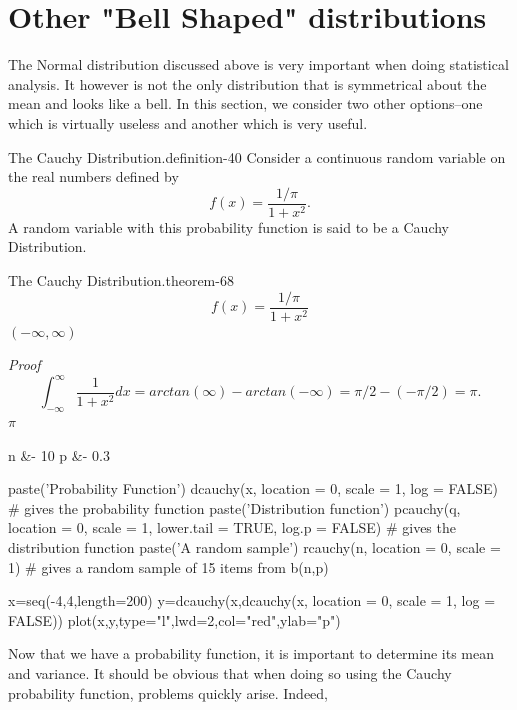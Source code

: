 \documentclass[10pt,]{book}
\makeatletter
\renewcommand*{\proofname}{Proof}
\renewenvironment{proof}[1][\proofname]{\par
  \pushQED{\qed}%
  \normalfont \topsep6\p@\@plus6\p@\relax
  \trivlist
  \item\relax
    {\itshape
    #1\@addpunct{.}}\hspace\labelsep\ignorespaces
}{%
  \popQED\endtrivlist\@endpefalse
}
\numberwithin{equation}{section}
\makeatother
\begin{document}
\section[{Other "Bell Shaped" distributions}]{Other "Bell Shaped" distributions}\label{section-60}
\hypertarget{p-1052}{}%
The Normal distribution discussed above is very important when doing statistical analysis. It however is not the only distribution that is symmetrical about the mean and looks like a bell.  In this section, we consider two other options--one which is virtually useless and another which is very useful.%
\par
\hypertarget{p-1053}{}%
\begin{definition}{The Cauchy Distribution.}{definition-40}%
\hypertarget{p-1054}{}%
Consider a continuous random variable on the real numbers defined by%
\begin{equation*}
f(x) = \frac{1/\pi}{1+x^2}.
\end{equation*}
A random variable with this probability function is said to be a Cauchy Distribution.%
\end{definition}
%
\begin{theorem}{The Cauchy Distribution.}{}{theorem-68}%
%
\begin{equation*}
f(x) = \frac{1/\pi}{1+x^2}
\end{equation*}
\((-\infty, \infty)\)\end{theorem}
\begin{proof}\hypertarget{proof-67}{}
%
\begin{equation*}
\int_{-\infty}^{\infty} \frac{1}{1+x^2} dx = arctan(\infty) - arctan(-\infty) = \pi/2 - (-\pi/2) = \pi.
\end{equation*}
\(\pi\)\end{proof}
\begin{sageinput}
n &- 10
p &- 0.3

paste('Probability Function')
dcauchy(x, location = 0, scale = 1, log = FALSE)   # gives the probability function
paste('Distribution function')
pcauchy(q, location = 0, scale = 1, lower.tail = TRUE, log.p = FALSE)
   # gives the distribution function
paste('A random sample')
rcauchy(n, location = 0, scale = 1)    # gives a random sample of 15 items from b(n,p)

x=seq(-4,4,length=200)
y=dcauchy(x,dcauchy(x, location = 0, scale = 1, log = FALSE))
plot(x,y,type="l",lwd=2,col="red",ylab="p")
\end{sageinput}
\hypertarget{p-1055}{}%
Now that we have a probability function, it is important to determine its mean and variance. It should be obvious that when doing so using the Cauchy probability function, problems quickly arise.  Indeed,%
\end{document}
